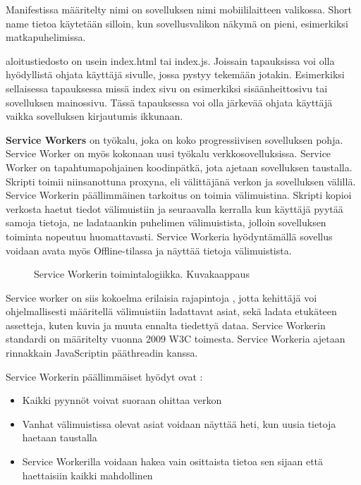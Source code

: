 \documentclass{tktltiki}
\begin{document}
Manifestissa määritelty nimi on sovelluksen nimi mobiililaitteen valikossa. Short name tietoa käytetään silloin, kun sovellusvalikon näkymä on pieni, esimerkiksi matkapuhelimissa.

aloitustiedosto on usein index.html tai index.js. Joissain tapauksissa voi olla hyödyllistä ohjata käyttäjä sivulle, jossa pystyy tekemään jotakin. Esimerkiksi sellaisessa tapauksessa missä index sivu on esimerkiksi sisäänheittosivu tai sovelluksen mainossivu. Tässä tapauksessa voi olla järkevää ohjata käyttäjä vaikka sovelluksen kirjautumis ikkunaan.

\clearpage

\textbf{Service Workers} on työkalu, joka on koko progressiivisen sovelluksen pohja. Service Worker on myös kokonaan uusi työkalu verkkosovelluksissa. Service Worker on tapahtumapohjainen koodinpätkä, jota ajetaan sovelluksen taustalla. Skripti toimii niinsanottuna proxyna, eli välittäjänä verkon ja sovelluksen välillä. Service Workerin päällimmäinen tarkoitus on toimia välimuistina. Skripti kopioi verkosta haetut tiedot välimuistiin ja seuraavalla kerralla kun käyttäjä pyytää samoja tietoja, ne ladataankin puhelimen välimuistista, jolloin sovelluksen toiminta nopeutuu huomattavasti. Service Workeria hyödyntämällä sovellus voidaan avata myös Offline-tilassa ja näyttää tietoja välimuistista. 

\begin{figure}[h]
\begin{center}
\caption{Service Workerin toimintalogiikka. Kuvakaappaus \cite{GoogleDevSummit} }
\label{Service workerin toiminta}
\end{center}
\end{figure}
\clearpage

Service worker on siis kokoelma erilaisia rajapintoja \cite{malavolta2017assessing}, jotta kehittäjä voi ohjelmallisesti määritellä välimuistiin ladattavat asiat, sekä ladata etukäteen assetteja, kuten kuvia ja muuta ennalta tiedettyä dataa. Service Workerin standardi on määritelty vuonna 2009 W3C toimesta. Service Workeria ajetaan rinnakkain JavaScriptin pääthreadin kanssa.

Service Workerin päällimmäiset hyödyt ovat \cite{GoogleDevSummit}:

\begin{itemize}
  \item Kaikki pyynnöt voivat suoraan ohittaa verkon
  \item Vanhat välimuistissa olevat asiat voidaan näyttää heti, kun uusia tietoja haetaan taustalla
  \item Service Workerilla voidaan hakea vain osittaista tietoa sen sijaan että haettaisiin kaikki mahdollinen
\end{itemize}
\end{document}

